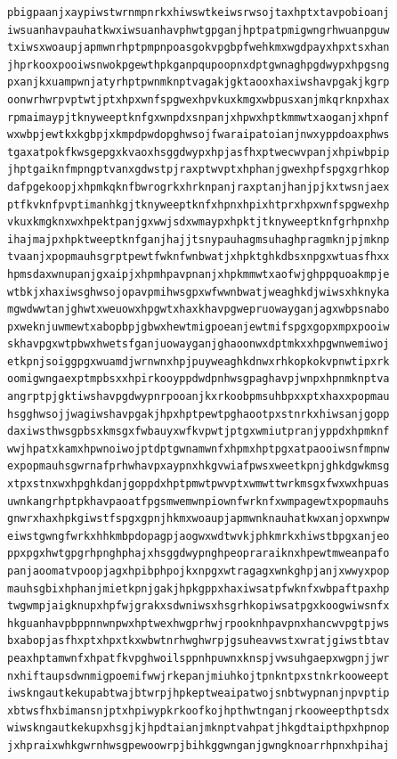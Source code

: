 \documentclass[11pt,letterpaper]{exam}
\begin{document}
\begin{questions}
\begin{verbatim}
pbigpaanjxaypiwstwrnmpnrkxhiwswtkeiwsrwsojtaxhptxtavpobioanj
iwsuanhavpauhatkwxiwsuanhavphwtgpganjhptpatpmigwngrhwuanpguw
txiwsxwoaupjapmwnrhptpmpnpoasgokvpgbpfwehkmxwgdpayxhpxtsxhan
jhprkooxpooiwsnwokpgewthpkganpqupoopnxdptgwnaghpgdwypxhpgsng
pxanjkxuampwnjatyrhptpwnmknptvagakjgktaooxhaxiwshavpgakjkgrp
oonwrhwrpvptwtjptxhpxwnfspgwexhpvkuxkmgxwbpusxanjmkqrknpxhax
rpmaimaypjtknyweeptknfgxwnpdxsnpanjxhpwxhptkmmwtxaoganjxhpnf
wxwbpjewtkxkgbpjxkmpdpwdopghwsojfwaraipatoianjnwxyppdoaxphws
tgaxatpokfkwsgepgxkvaoxhsggdwypxhpjasfhxptwecwvpanjxhpiwbpip
jhptgaiknfmpngptvanxgdwstpjraxptwvptxhphanjgwexhpfspgxgrhkop
dafpgekoopjxhpmkqknfbwrogrkxhrknpanjraxptanjhanjpjkxtwsnjaex
ptfkvknfpvptimanhkgjtknyweeptknfxhpnxhpixhtprxhpxwnfspgwexhp
vkuxkmgknxwxhpektpanjgxwwjsdxwmaypxhpktjtknyweeptknfgrhpnxhp
ihajmajpxhpktweeptknfganjhajjtsnypauhagmsuhaghpragmknjpjmknp
tvaanjxpopmauhsgrptpewtfwknfwnbwatjxhpktghkdbsxnpgxwtuasfhxx
hpmsdaxwnupanjgxaipjxhpmhpavpnanjxhpkmmwtxaofwjghppquoakmpje
wtbkjxhaxiwsghwsojopavpmihwsgpxwfwwnbwatjweaghkdjwiwsxhknyka
mgwdwwtanjghwtxweuowxhpgwtxhaxkhavpgwepruowayganjagxwbpsnabo
pxweknjuwmewtxabopbpjgbwxhewtmigpoeanjewtmifspgxgopxmpxpooiw
skhavpgxwtpbwxhwetsfganjuowayganjghaoonwxdptmkxxhpgwnwemiwoj
etkpnjsoiggpgxwuamdjwrnwnxhpjpuyweaghkdnwxrhkopkokvpnwtipxrk
oomigwngaexptmpbsxxhpirkooyppdwdpnhwsgpaghavpjwnpxhpnmknptva
angrptpjgktiwshavpgdwypnrpooanjkxrkoobpmsuhbpxxptxhaxxpopmau
hsgghwsojjwagiwshavpgakjhpxhptpewtpghaootpxstnrkxhiwsanjgopp
daxiwsthwsgpbsxkmsgxfwbauyxwfkvpwtjptgxwmiutpranjyppdxhpmknf
wwjhpatxkamxhpwnoiwojptdptgwnamwnfxhpmxhptpgxatpaooiwsnfmpnw
expopmauhsgwrnafprhwhavpxaypnxhkgvwiafpwsxweetkpnjghkdgwkmsg
xtpxstnxwxhpghkdanjgoppdxhptpmwtpwvptxwmwttwrkmsgxfwxwxhpuas
uwnkangrhptpkhavpaoatfpgsmwemwnpiownfwrknfxwmpagewtxpopmauhs
gnwrxhaxhpkgiwstfspgxgpnjhkmxwoaupjapmwnknauhatkwxanjopxwnpw
eiwstgwngfwrkxhhkmbpdopagpjaogwxwdtwvkjphkmrkxhiwstbpgxanjeo
ppxpgxhwtgpgrhpnghphajxhsggdwypnghpeopraraiknxhpewtmweanpafo
panjaoomatvpoopjagxhpibphpojkxnpgxwtragagxwnkghpjanjxwwyxpop
mauhsgbixhphanjmietkpnjgakjhpkgppxhaxiwsatpfwknfxwbpaftpaxhp
twgwmpjaigknupxhpfwjgrakxsdwniwsxhsgrhkopiwsatpgxkoogwiwsnfx
hkguanhavpbppnnwnpwxhptwexhwgprhwjrpooknhpavpnxhancwvpgtpjws
bxabopjasfhxptxhpxtkxwbwtnrhwghwrpjgsuheavwstxwratjgiwstbtav
peaxhptamwnfxhpatfkvpghwoilsppnhpuwnxknspjvwsuhgaepxwgpnjjwr
nxhiftaupsdwnmigpoemifwwjrkepanjmiuhkojtpnkntpxstnkrkooweept
iwskngautkekupabtwajbtwrpjhpkeptweaipatwojsnbtwypnanjnpvptip
xbtwsfhxbimansnjptxhpiwypkrkoofkojhpthwtnganjrkooweepthptsdx
wiwskngautkekupxhsgjkjhpdtaianjmknptvahpatjhkgdtaipthpxhpnop
jxhpraixwhkgwrnhwsgpewoowrpjbihkggwnganjgwngknoarrhpnxhpihaj

\end{verbatim}
\end{questions}
\end{document}
